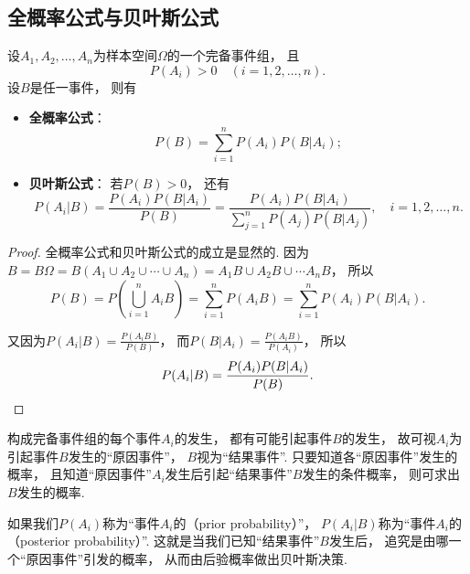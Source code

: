 \subsection{全概率公式与贝叶斯公式}
\begin{theorem}
设\(A_1,A_2,\dotsc,A_n\)为样本空间\(\Omega\)的一个完备事件组，
且\begin{equation*}
	P(A_i) > 0 \quad(i=1,2,\dotsc,n).
\end{equation*}
设\(B\)是任一事件，
则有\begin{itemize}
	\item {\rm\bf 全概率公式}：\begin{equation}\label{equation:条件概率.全概率公式}
		P(B) = \sum_{i=1}^n P(A_i) P(B \vert A_i);
	\end{equation}

	\item {\rm\bf 贝叶斯公式}：
	若\(P(B) > 0\)，
	还有\begin{equation}\label{equation:条件概率.贝叶斯公式}
		P(A_i \vert B) = \frac{P(A_i) P(B \vert A_i)}{P(B)}
		= \frac{P(A_i) P(B \vert A_i)}{\sum_{j=1}^n P(A_j) P(B \vert A_j)},
		\quad i = 1,2,\dotsc,n.
	\end{equation}
\end{itemize}
\begin{proof}
全概率公式和贝叶斯公式的成立是显然的.
因为\(B = B \Omega
= B(A_1 \cup A_2 \cup \dotsb \cup A_n)
= A_1 B \cup A_2 B \cup \dotsb A_n B\)，
所以\begin{equation*}
	P(B) = P\left(\bigcup_{i=1}^n A_i B\right)
	= \sum_{i=1}^n P(A_i B)
	= \sum_{i=1}^n P(A_i) P(B \vert A_i).
\end{equation*}

又因为\(P(A_i \vert B)
= \frac{P(A_i B)}{P(B)}\)，
而\(P(B \vert A_i)
= \frac{P(A_i B)}{P(A_i)}\)，
所以\begin{equation*}
	P(A_i \vert B) = \frac{P(A_i) P(B \vert A_i)}{P(B)}.
	\qedhere
\end{equation*}
\end{proof}
\end{theorem}

构成完备事件组的每个事件\(A_i\)的发生，
都有可能引起事件\(B\)的发生，
故可视\(A_i\)为引起事件\(B\)发生的“原因事件”，
\(B\)视为“结果事件”.
只要知道各“原因事件”发生的概率，
且知道“原因事件”\(A_i\)发生后引起“结果事件”\(B\)发生的条件概率，
则可求出\(B\)发生的概率.

如果我们\(P(A_i)\)称为“事件\(A_i\)的（prior probability）”，
\(P(A_i \vert B)\)称为“事件\(A_i\)的（posterior probability）”.
这就是当我们已知“结果事件”\(B\)发生后，
追究是由哪一个“原因事件”引发的概率，
从而由后验概率做出贝叶斯决策.

